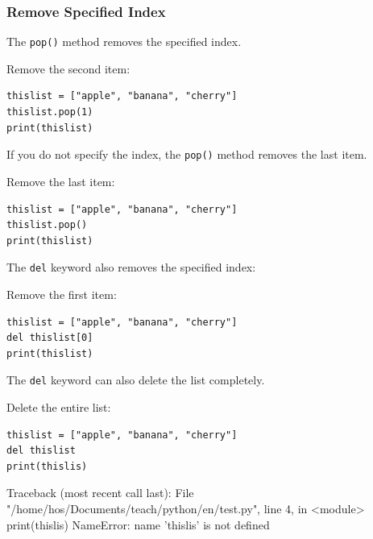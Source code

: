 \documentclass[12pt,a4paper]{article}
\newcommand{\code}[1]{%
	\colorbox{backcolour}{\lstinline{#1}}%
}
\begin{document}
\subsubsection{Remove Specified Index}

The \code{pop()} method removes the specified index.

\begin{ebox}
Remove the second item:
	\begin{lstlisting}
thislist = ["apple", "banana", "cherry"]
thislist.pop(1)
print(thislist)
	\end{lstlisting}
\tcblower
	\begin{vercode}
	\end{vercode}
\end{ebox}

If you do not specify the index, the \code{pop()} method removes the last item.

\begin{ebox}
Remove the last item:
	\begin{lstlisting}
thislist = ["apple", "banana", "cherry"]
thislist.pop()
print(thislist)
	\end{lstlisting}
\tcblower
	\begin{vercode}
	\end{vercode}
\end{ebox}

The \code{del} keyword also removes the specified index:

\begin{ebox}
Remove the first item:
	\begin{lstlisting}
thislist = ["apple", "banana", "cherry"]
del thislist[0]
print(thislist)
	\end{lstlisting}
\tcblower
	\begin{vercode}
	\end{vercode}
\end{ebox}

The \code{del} keyword can also delete the list completely.

\begin{abox}
Delete the entire list:
	\begin{lstlisting}
thislist = ["apple", "banana", "cherry"]
del thislist
print(thislis)
	\end{lstlisting}
\tcblower
	\begin{vercode}
Traceback (most recent call last):
	File "/home/hos/Documents/teach/python/en/test.py",
	line 4, in <module>
		print(thislis)
NameError: name 'thislis' is not defined
	\end{vercode}
\end{abox}
\end{document}
